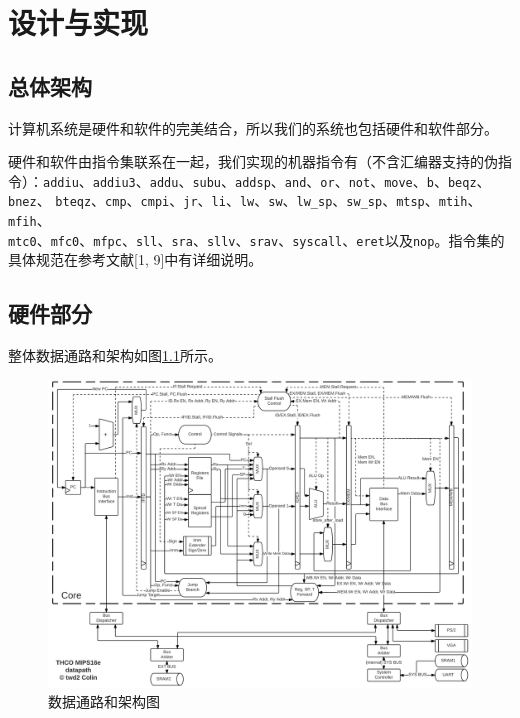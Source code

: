 \documentclass[11pt,utf8]{report}
\begin{document}
\chapter{设计与实现}

\section{总体架构}
	计算机系统是硬件和软件的完美结合，所以我们的系统也包括硬件和软件部分。
	
	硬件和软件由指令集联系在一起，我们实现的机器指令有（不含汇编器支持的伪指令）：\texttt{addiu}、\texttt{addiu3}、\texttt{addu}、\texttt{subu}、\texttt{addsp}、\texttt{and}、\texttt{or}、\texttt{not}、\texttt{move}、\texttt{b}、\texttt{beqz}、\\\texttt{bnez}、 \texttt{bteqz}、\texttt{cmp}、\texttt{cmpi}、\texttt{jr}、\texttt{li}、\texttt{lw}、\texttt{sw}、\texttt{lw\_sp}、\texttt{sw\_sp}、\texttt{mtsp}、\texttt{mtih}、\texttt{mfih}、\\\texttt{mtc0}、\texttt{mfc0}、\texttt{mfpc}、\texttt{sll}、\texttt{sra}、\texttt{sllv}、\texttt{srav}、\texttt{syscall}、\texttt{eret}以及\texttt{nop}。指令集的具体规范在参考文献[1, 9]中有详细说明。

\section{硬件部分}

	整体数据通路和架构如图\ref{datapath}所示。

	\begin{figure}[h]
		\centering
		\setlength{\leftskip}{-40pt}
		\includegraphics[width=1.2\textwidth]{datapath}
		\caption{数据通路和架构图}
		\label{datapath}
	\end{figure}
\end{document}
